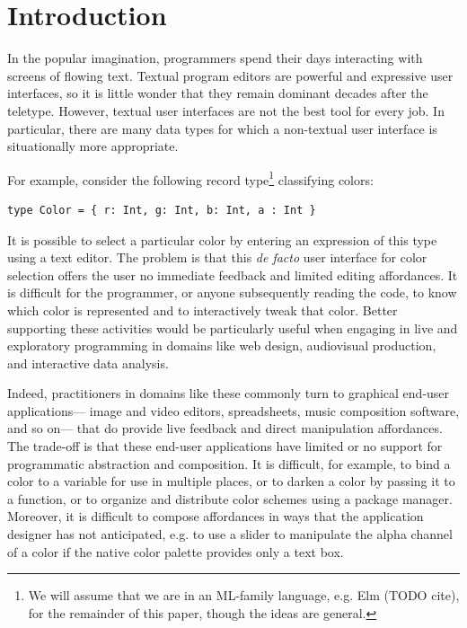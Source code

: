 \section{Introduction}\label{sec:intro}
In the popular imagination, programmers spend their days interacting with screens of flowing text. 
Textual program editors are powerful and expressive user interfaces, 
so it is little wonder that they remain dominant decades after the teletype. 
However, textual user interfaces are not the best tool for every job. In particular, there are many 
data types for which a non-textual  
user interface is situationally more appropriate. 

For example, consider the following record type\footnote{We will assume that we are in an ML-family language, e.g. Elm (TODO cite), for the remainder of this paper, though the ideas are general.} classifying colors:
\begin{lstlisting}[numbers=none]
type Color = { r: Int, g: Int, b: Int, a : Int }
\end{lstlisting}
It is possible to select a particular color by entering  
an expression of this type using a text editor.
The problem is that this \emph{de facto} user interface for color selection offers the user no immediate feedback 
and limited editing affordances. 
It is difficult for the programmer, or anyone subsequently reading the code, to know which color is represented 
and to interactively tweak that color. 
Better supporting these activities would be particularly useful when engaging in live and exploratory programming 
in domains like web design, audiovisual production, and interactive data analysis.

Indeed, practitioners in domains like these commonly turn to   
graphical end-user applications---%
image and video editors, spreadsheets, music composition software, and so on---%
that do provide live feedback and 
direct manipulation affordances. 
The trade-off is that these end-user applications have limited or no support for programmatic abstraction and composition. 
It is difficult, for example, to bind a
color to a variable for use in multiple places, or to darken a color by passing it to a function, or to organize and distribute color schemes using a package manager.
Moreover, it is difficult to compose affordances in ways that the application designer has not 
anticipated, e.g. to use a slider to manipulate the alpha channel of a color 
if the native color palette provides only a text box.

